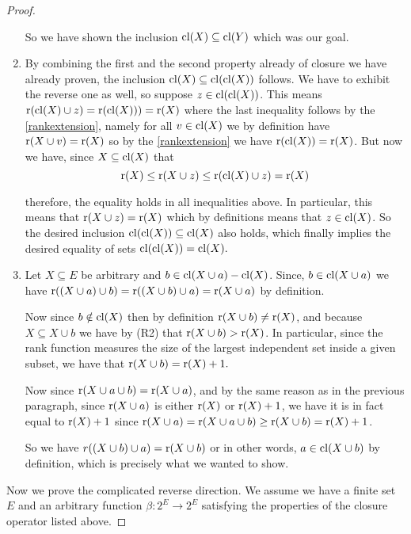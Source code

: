\begin{proof}
\begin{enumerate}
        So we have shown the inclusion $\mathrm{cl}(X) \subseteq \mathrm{cl}(Y)$ which was our goal.

        \item By combining the first and the second property already of closure we have already proven, the inclusion $\mathrm{cl}(X) \subseteq \mathrm{cl}(\mathrm{cl}(X))$  follows. We have to exhibit the reverse one as well, so suppose $z\in \mathrm{cl}(\mathrm{cl}(X))$. This means $\operatorname{r}(\mathrm{cl}(X) \cup z)= \operatorname{r}(\mathrm{cl}(X))) = \operatorname{r}(X)$ where the last inequality follows by the \ref{rankextension}, namely for all $v \in \mathrm{cl}(X)$ we by definition have $\operatorname{r}(X \cup v) = \operatorname{r}(X)$ so by the \ref{rankextension} we have $\operatorname{r}(\mathrm{cl}(X)) = \operatorname{r}(X)$. But now we have, since $X \subseteq \mathrm{cl}(X)$ that $$\operatorname{r}(X) \leq \operatorname{r}(X \cup z) \leq \operatorname{r}(\mathrm{cl}(X)\cup z) = \operatorname{r}(X)$$

       therefore, the equality holds in all inequalities above. In particular, this means that $\operatorname{r}(X \cup z) = \operatorname{r}(X)$ which by definitions means that $z \in \mathrm{cl}(X)$. So the desired inclusion $ \mathrm{cl}(\mathrm{cl}(X))\subseteq \mathrm{cl}(X)$ also holds, which finally implies the desired equality of sets $\mathrm{cl}(\mathrm{cl}(X))= \mathrm{cl}(X).$

        \item Let $X \subseteq E$ be arbitrary and $b \in \mathrm{cl}(X \cup a) - \mathrm{cl}(X)$. Since, $b \in \mathrm{cl}(X \cup a)$ we have $\operatorname{r}((X\cup a)\cup b) = \operatorname{r}((X\cup b) \cup a) = \operatorname{r}(X \cup a)$ by definition. 

        Now since $b \notin \mathrm{cl}(X)$ then by definition $\operatorname{r}(X \cup b)\neq \operatorname{r}(X)$, and because $X \subseteq X \cup b$ we have by (R2) that $\operatorname{r}(X \cup b) > \operatorname{r}(X)$. In particular, since the rank function measures the size of the largest independent set inside a given subset, we have that $\operatorname{r}(X \cup b) = \operatorname{r}(X)+1.$ 

        Now since $\operatorname{r}(X \cup a \cup b) = \operatorname{r}(X \cup a)$, and by the same reason as in the previous paragraph, since $\operatorname{r}(X \cup a)$ is either $\operatorname{r}(X)$ or $\operatorname{r}(X) + 1$, we have it is in fact equal to $\operatorname{r}(X) + 1$ since $\operatorname{r}(X \cup a) = \operatorname{r}(X \cup a \cup b) \geq \operatorname{r}(X \cup b)= \operatorname{r}(X) + 1$.

        So we have $r((X\cup b) \cup a) = \operatorname{r}(X \cup b)$ or in other words, $a \in \mathrm{cl}(X \cup b)$ by definition, which is precisely what we wanted to show.
       
        \end{enumerate}



    Now we prove the complicated reverse direction. We assume we have a finite set $E$ and an arbitrary function $\beta : 2^E \to 2^E$ satisfying the properties of the closure operator listed above.


\end{proof}
